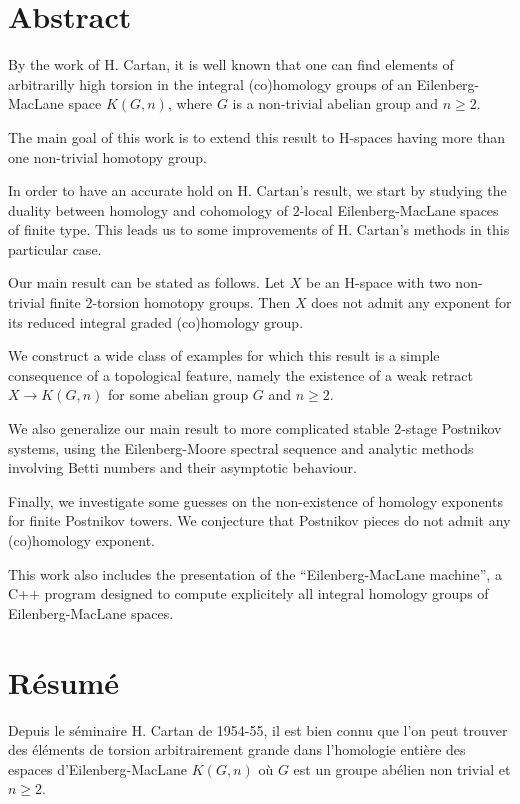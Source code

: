 \chapter*{Abstract}

By the work of H. Cartan, it is well known that one can find elements of arbitrarilly high torsion in the integral (co)homology groups of an Eilenberg-MacLane space $K(G,n)$, where $G$ is a non-trivial abelian group and $n\geq 2$.

\medskip
The main goal of this work is to extend this result to H-spaces having more than one non-trivial homotopy group.

\medskip
In order to have an accurate hold on H. Cartan's result, we start by studying the duality between homology and cohomology of $2$-local Eilenberg-MacLane spaces of finite type. This leads us to some improvements of H. Cartan's methods in this particular case.

\medskip
Our main result can be stated as follows. Let $X$ be an H-space with two non-trivial finite $2$-torsion homotopy groups. Then $X$ does not admit any exponent for its reduced integral graded (co)homology group.

\medskip
We construct a wide class of examples for which this result is a simple consequence of a topological feature, namely the existence of a weak retract $X\to K(G,n)$ for some abelian group $G$ and $n\geq2$.

\medskip
We also generalize our main result to more complicated stable \mbox{$2$-stage} Postnikov systems, using the Eilenberg-Moore spectral sequence and analytic methods involving Betti numbers and their asymptotic behaviour.

\medskip
Finally, we investigate some guesses on the non-existence of homology exponents for finite Postnikov towers. We conjecture that Postnikov pieces do not admit any (co)homology exponent.

\medskip
This work also includes the presentation of the ``Eilenberg-MacLane machine'', a C++ program designed to compute explicitely all integral homology groups of Eilenberg-MacLane spaces.


\chapter*{R\'esum\'e}

Depuis le s\'eminaire H. Cartan de 1954-55, il est bien connu que l'on peut trouver des \'el\'ements de torsion arbitrairement grande dans l'homologie enti\`ere des espaces d'Eilenberg-MacLane $K(G,n)$ o\`u $G$ est un groupe ab\'elien non trivial et $n\geq2$. 

